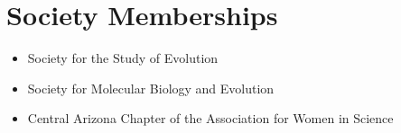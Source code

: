 \documentclass[]{cv-style}          %
\begin{document}
\section{Society Memberships}
\begin{itemize}
\item Society for the Study of Evolution
\item Society for Molecular Biology and Evolution
\item Central Arizona Chapter of the Association for Women in Science
\end{itemize}
\end{document}
